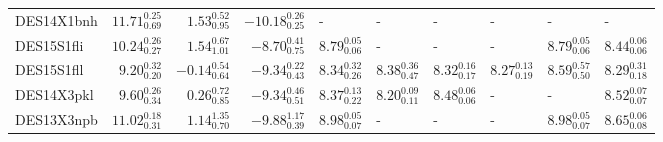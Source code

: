 \documentclass[fleqn,usenatbib,]{mnras}
\begin{document}
\begin{table}
\begin{threeparttable}
\begin{tabular}{lrrrllllll}
DES14X1bnh &  $11.71 _{\scriptscriptstyle 0.69} ^{\scriptscriptstyle 0.25}$ &   $1.53 _{\scriptscriptstyle 0.95} ^{\scriptscriptstyle 0.52}$ &  $-10.18 _{\scriptscriptstyle 0.25} ^{\scriptscriptstyle 0.26}$ &                                                             - &                                                             - &                                                             - &                                                             - &                                                             - &                                                              - \\
DES15S1fli &  $10.24 _{\scriptscriptstyle 0.27} ^{\scriptscriptstyle 0.26}$ &   $1.54 _{\scriptscriptstyle 1.01} ^{\scriptscriptstyle 0.67}$ &   $-8.70 _{\scriptscriptstyle 0.75} ^{\scriptscriptstyle 0.41}$ &  $8.79 _{\scriptscriptstyle 0.06} ^{\scriptscriptstyle 0.05}$ &                                                             - &                                                             - &                                                             - &  $8.79 _{\scriptscriptstyle 0.06} ^{\scriptscriptstyle 0.05}$ &   $8.44 _{\scriptscriptstyle 0.06} ^{\scriptscriptstyle 0.06}$ \\
DES15S1fll &   $9.20 _{\scriptscriptstyle 0.20} ^{\scriptscriptstyle 0.32}$ &  $-0.14 _{\scriptscriptstyle 0.64} ^{\scriptscriptstyle 0.54}$ &   $-9.34 _{\scriptscriptstyle 0.43} ^{\scriptscriptstyle 0.22}$ &  $8.34 _{\scriptscriptstyle 0.26} ^{\scriptscriptstyle 0.32}$ &  $8.38 _{\scriptscriptstyle 0.47} ^{\scriptscriptstyle 0.36}$ &  $8.32 _{\scriptscriptstyle 0.17} ^{\scriptscriptstyle 0.16}$ &  $8.27 _{\scriptscriptstyle 0.19} ^{\scriptscriptstyle 0.13}$ &  $8.59 _{\scriptscriptstyle 0.50} ^{\scriptscriptstyle 0.57}$ &   $8.29 _{\scriptscriptstyle 0.18} ^{\scriptscriptstyle 0.31}$ \\
DES14X3pkl &   $9.60 _{\scriptscriptstyle 0.34} ^{\scriptscriptstyle 0.26}$ &   $0.26 _{\scriptscriptstyle 0.85} ^{\scriptscriptstyle 0.72}$ &   $-9.34 _{\scriptscriptstyle 0.51} ^{\scriptscriptstyle 0.46}$ &  $8.37 _{\scriptscriptstyle 0.22} ^{\scriptscriptstyle 0.13}$ &  $8.20 _{\scriptscriptstyle 0.11} ^{\scriptscriptstyle 0.09}$ &  $8.48 _{\scriptscriptstyle 0.06} ^{\scriptscriptstyle 0.06}$ &                                                             - &                                                             - &   $8.52 _{\scriptscriptstyle 0.07} ^{\scriptscriptstyle 0.07}$ \\
DES13X3npb &  $11.02 _{\scriptscriptstyle 0.31} ^{\scriptscriptstyle 0.18}$ &   $1.14 _{\scriptscriptstyle 0.70} ^{\scriptscriptstyle 1.35}$ &   $-9.88 _{\scriptscriptstyle 0.39} ^{\scriptscriptstyle 1.17}$ &  $8.98 _{\scriptscriptstyle 0.07} ^{\scriptscriptstyle 0.05}$ &                                                             - &                                                             - &                                                             - &  $8.98 _{\scriptscriptstyle 0.07} ^{\scriptscriptstyle 0.05}$ &   $8.65 _{\scriptscriptstyle 0.08} ^{\scriptscriptstyle 0.06}$ \\

\end{tabular}
\end{threeparttable}
\end{table}
\end{document}
